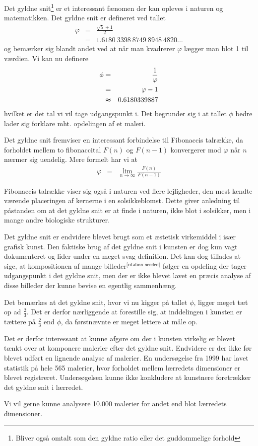 Det gyldne snit\footnote{Bliver også omtalt som den gyldne ratio eller det
guddommelige forhold} er et interessant fænomen der kan opleves i naturen og
matematikken. Det gyldne snit er defineret ved tallet
\begin{eqnarray*}
	\varphi	& =	& \frac{\sqrt{5} + 1}{2}\\
		& = 	& 1.6180\ 3398\ 8749\ 8948\ 4820 \dots
\end{eqnarray*}
og bemærker sig blandt andet ved at når man kvadrerer $\varphi$ lægger man
blot 1 til værdien\cite{Bib:MWGold}\cite{Bib:Knott}. Vi kan nu definere
\begin{eqnarray*}
	\phi	& = 		& \frac{1}{\varphi}\\
		& = 		& \varphi - 1\\
		& \thickapprox	& 0.6180339887
\end{eqnarray*}
hvilket er det tal vi vil tage udgangspunkt i. Det begrunder sig i at tallet
$\phi$ bedre lader sig forklare mht. opdelingen af et maleri.

Det gyldne snit fremviser en interessant forbindelse til
Fibonaccis talrække, da forholdet mellem to fibonaccital $F(n)$ og $F(n - 1)$
konvergerer mod $\varphi$ når $n$ nærmer sig uendelig. Mere formelt har vi at
\begin{eqnarray*}
	\varphi	& =	& \lim_{n \rightarrow \infty}{\frac{F(n)}{F(n - 1)}}
\end{eqnarray*}

Fibonaccis talrække viser sig også i naturen ved flere lejligheder, den mest
kendte værende placeringen af kernerne i en
solsikkeblomst\cite{Bib:Dou}. Dette
giver anledning til påstanden om at det gyldne snit er at finde i naturen, ikke
blot i solsikker, men i mange andre biologiske strukturer.

Det gyldne snit er endvidere blevet brugt som et æstetisk virkemiddel i især
grafisk kunst. Den faktiske brug af det gyldne snit i kunsten er dog kun vagt
dokumenteret og lider under en meget svag definition\cite{Bib:Mark}.
Det kan dog tillades at sige, at kompositionen af mange
billeder$^{\textsf{[citation needed]}}$ følger en opdeling der tager
udgangspunkt i det gyldne snit, men der er ikke blevet lavet en præcis analyse
af disse billeder der kunne bevise en egentlig sammenhæng.

Det bemærkes at det gyldne snit, hvor vi nu kigger på tallet $\phi$, ligger
meget tæt op ad $\frac{2}{3}$.  Det er derfor nærliggende at forestille sig, at
inddelingen i kunsten er tættere på $\frac{2}{3}$ end $\phi$, da førstnævnte
er meget lettere at måle op.

Det er derfor interessant at kunne afgøre om der i kunsten virkelig er blevet
tænkt over at komponere malerier efter det gyldne snit. Endvidere er der ikke
før blevet udført en lignende analyse af malerier. En undersøgelse fra 1999 har
lavet statistik på hele 565 malerier, hvor forholdet mellem lærredets
dimensioner er blevet registreret\cite{Bib:Painting}. Undersøgelsen kunne ikke
konkludere at kunstnere foretrækker det gyldne snit i lærredet.

Vi vil gerne kunne analysere 10.000 malerier for andet end blot lærredets
dimensioner.
